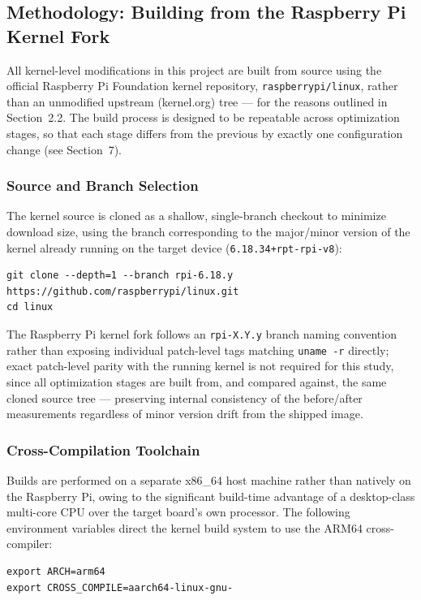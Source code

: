 \documentclass[11pt,a4paper]{article}
\begin{document}
\subsection{Methodology: Building from the Raspberry Pi Kernel Fork}
 
All kernel-level modifications in this project are built from source using the official Raspberry Pi Foundation kernel repository, \texttt{raspberrypi/linux}, rather than an unmodified upstream (kernel.org) tree — for the reasons outlined in Section~2.2. The build process is designed to be repeatable across optimization stages, so that each stage differs from the previous by exactly one configuration change (see Section~7).
 
\subsubsection*{Source and Branch Selection}
The kernel source is cloned as a shallow, single-branch checkout to minimize download size, using the branch corresponding to the major/minor version of the kernel already running on the target device (\texttt{6.18.34+rpt-rpi-v8}):
\begin{lstlisting}
git clone --depth=1 --branch rpi-6.18.y https://github.com/raspberrypi/linux.git
cd linux
\end{lstlisting}
The Raspberry Pi kernel fork follows an \texttt{rpi-X.Y.y} branch naming convention rather than exposing individual patch-level tags matching \texttt{uname -r} directly; exact patch-level parity with the running kernel is not required for this study, since all optimization stages are built from, and compared against, the same cloned source tree — preserving internal consistency of the before/after measurements regardless of minor version drift from the shipped image.
 
\subsubsection*{Cross-Compilation Toolchain}
Builds are performed on a separate x86\_64 host machine rather than natively on the Raspberry Pi, owing to the significant build-time advantage of a desktop-class multi-core CPU over the target board's own processor. The following environment variables direct the kernel build system to use the ARM64 cross-compiler:
\begin{lstlisting}
export ARCH=arm64
export CROSS_COMPILE=aarch64-linux-gnu-
\end{lstlisting}
 
\end{document}
